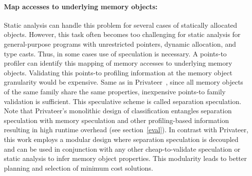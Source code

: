 \paragraph{Map accesses to underlying memory objects:}
%
Static analysis can handle this problem for several cases of statically
allocated objects.
%
However, this task often becomes too challenging for static analysis for
general-purpose programs with unrestricted pointers, dynamic allocation, and
type casts.
%
%
Thus, in some cases use of speculation is necessary.
%
A points-to profiler can identify this mapping of memory accesses to underlying
memory objects.
%
Validating this points-to profiling information at the memory object granularity
would be expensive.
%
%
%
Same as in Privateer~\cite{johnson:pldi:12}, since all memory objects of the
same family share the same properties, inexpensive points-to family validation
is sufficient.
%
%
%
This speculative scheme is called separation speculation.
%
Note that Privateer's monolithic design of classification entangles separation
speculation with memory speculation and other profiling-based information
resulting in high runtime overhead (see section~\ref{eval}).
%
In contrast with Privateer, this work employs a modular design where separation
speculation is decoupled and can be used in conjunction with any other
cheap-to-validate speculation or static analysis to infer memory object
properties. This modularity leads to better planning and selection of minimum
cost solutions.

